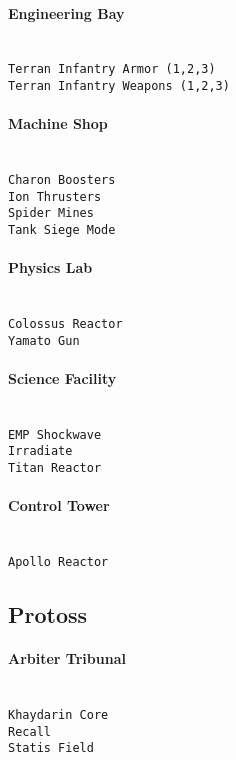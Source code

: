 \paragraph{Engineering Bay} \mbox{}\\
\verb|Terran Infantry Armor (1,2,3)|\\
\verb|Terran Infantry Weapons (1,2,3)|

\paragraph{Machine Shop} \mbox{}\\
\verb|Charon Boosters|\\
\verb|Ion Thrusters|\\
\verb|Spider Mines|\\
\verb|Tank Siege Mode|

\paragraph{Physics Lab} \mbox{}\\
\verb|Colossus Reactor|\\
\verb|Yamato Gun|

\paragraph{Science Facility} \mbox{}\\
\verb|EMP Shockwave|\\
\verb|Irradiate|\\
\verb|Titan Reactor|

\paragraph{Control Tower} \mbox{}\\
\verb|Apollo Reactor|

\subsection{Protoss}

\paragraph{Arbiter Tribunal} \mbox{}\\
\verb|Khaydarin Core|\\
\verb|Recall|\\
\verb|Statis Field|

